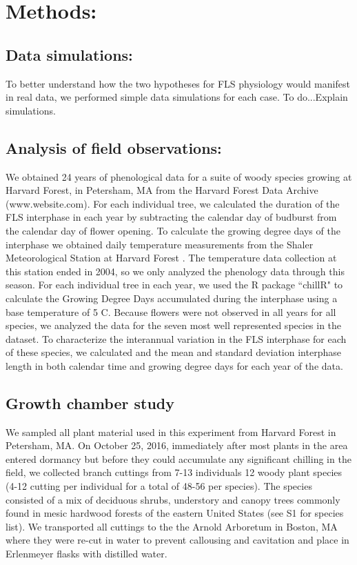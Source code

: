\documentclass[11pt]{article}
\begin{document}
\section{Methods:}
\subsection*{Data simulations:}
\noindent To better understand how the two hypotheses for FLS physiology would manifest in real data, we performed simple data simulations for each case.  To do...Explain simulations.

\subsection*{Analysis of field observations:}
\noindent We obtained 24 years of phenological data for a suite of woody species growing at Harvard Forest, in Petersham, MA \citep{Okeefe2015} from the Harvard Forest Data Archive (www.website.com).  For each individual tree, we calculated the duration of the FLS interphase in each year by subtracting the calendar day of budburst from the calendar day of flower opening. To calculate the growing degree days of the interphase we obtained daily temperature measurements from the Shaler Meteorological Station at Harvard Forest \citep{}. The temperature data collection at this station ended in 2004, so we only analyzed the phenology data through this season. For each individual tree in each year, we used the R package ``chillR" \citep{} to calculate the Growing Degree Days accumulated during the interphase using a base temperature of 5 \degree C. Because flowers were not observed in all years for all species, we analyzed the data for the seven most well represented species in the dataset. To characterize the interannual variation in the FLS interphase for each of these species, we calculated and the mean and standard deviation interphase length in both calendar time and growing degree days for each year of the data.
\subsection*{Growth chamber study}
\noindent We sampled all plant material used in this experiment from Harvard Forest in Petersham, MA. On October 25, 2016, immediately after most plants in the area entered dormancy but before they could accumulate any significant chilling in the field,  we collected branch cuttings from 7-13 individuals 12 woody plant species (4-12 cutting per individual for a total of 48-56 per species). The species consisted of a mix of deciduous shrubs, understory and canopy trees commonly found in mesic hardwood forests of the eastern United States (see S1 for species list). We transported all cuttings to the the Arnold Arboretum in Boston, MA where they were re-cut in water to prevent callousing and cavitation and place in Erlenmeyer flasks with distilled water.\\
\end{document}
